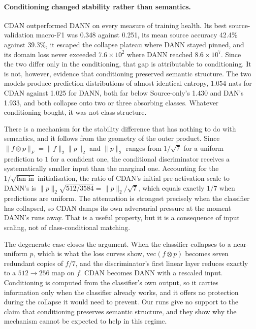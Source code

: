 \paragraph{Conditioning changed stability rather than semantics.}
CDAN outperformed DANN on every measure of training health. Its best
source-validation macro-F1 was 0.348 against 0.251, its mean source accuracy 42.4\%
against 39.3\%, it escaped the collapse plateau where DANN stayed pinned, and its
domain loss never exceeded $7.6 \times 10^{2}$ where DANN reached
$8.6 \times 10^{7}$. Since the two differ only in the conditioning, that gap is
attributable to conditioning. It is not, however, evidence that conditioning
preserved semantic structure. The two models produce prediction distributions of
almost identical entropy, 1.054 nats for CDAN against 1.025 for DANN, both far
below Source-only's 1.430 and DAN's 1.933, and both collapse onto two or three
absorbing classes. Whatever conditioning bought, it was not class structure.

There is a mechanism for the stability difference that has nothing to do with
semantics, and it follows from the geometry of the outer product. Since
$\lVert f \otimes p \rVert_F = \lVert f \rVert_2 \lVert p \rVert_2$ and
$\lVert p \rVert_2$ ranges from $1/\sqrt{7}$ for a uniform prediction to $1$ for a
confident one, the conditional discriminator receives a systematically smaller
input than the marginal one. Accounting for the $1/\sqrt{\text{fan-in}}$
initialisation, the ratio of CDAN's initial pre-activation scale to DANN's is
$\lVert p \rVert_2 \sqrt{512/3584} = \lVert p \rVert_2 / \sqrt{7}$, which equals
exactly $1/7$ when predictions are uniform. The attenuation is strongest precisely
when the classifier has collapsed, so CDAN damps its own adversarial pressure at
the moment DANN's runs away. That is a useful property, but it is a consequence of
input scaling, not of class-conditional matching.

The degenerate case closes the argument. When the classifier collapses to a
near-uniform $p$, which is what the loss curves show, $\mathrm{vec}(f \otimes p)$
becomes seven redundant copies of $f/7$, and the discriminator's first linear
layer reduces exactly to a $512 \to 256$ map on $f$. CDAN becomes DANN with a
rescaled input. Conditioning is computed from the classifier's own output, so it
carries information only when the classifier already works, and it offers no
protection during the collapse it would need to prevent. Our runs give no support
to the claim that conditioning preserves semantic structure, and they show why the
mechanism cannot be expected to help in this regime.

